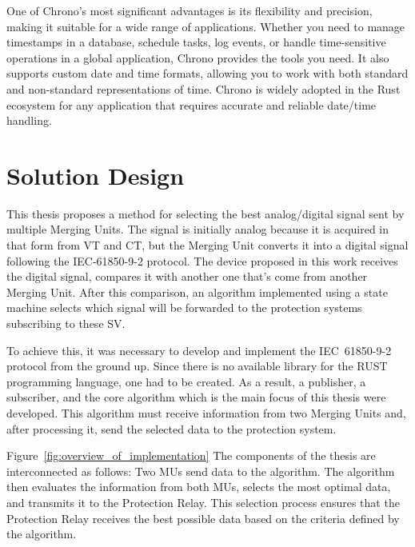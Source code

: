 One of Chrono's most significant advantages is its flexibility and precision, making it suitable for a wide range of applications. Whether you need to manage timestamps in a database, schedule tasks, log events, or handle time-sensitive operations in a global application, Chrono provides the tools you need. It also supports custom date and time formats, allowing you to work with both standard and non-standard representations of time. Chrono is widely adopted in the Rust ecosystem for any application that requires accurate and reliable date/time handling.

\section{Solution Design}

This thesis proposes a method for selecting the best analog/digital signal sent by multiple Merging Units. The signal is initially analog because it is acquired in that form from VT and CT, but the Merging Unit converts it into a digital signal following the IEC-61850-9-2 protocol. The device proposed in this work receives the digital signal, compares it with another one that's come from another Merging Unit. After this comparison, an algorithm implemented using a state machine selects which signal will be forwarded to the protection systems subscribing to these SV.

To achieve this, it was necessary to develop and implement the IEC~61850-9-2 protocol from the ground up. Since there is no available library for the RUST programming language, one had to be created. As a result, a publisher, a subscriber, and the core algorithm which is the main focus of this thesis were developed. This algorithm must receive information from two Merging Units and, after processing it, send the selected data to the protection system.

Figure~\ref{fig:overview_of_implementation} The components of the thesis are interconnected as follows: Two MUs send data to the algorithm. The algorithm then evaluates the information from both MUs, selects the most optimal data, and transmits it to the Protection Relay. This selection process ensures that the Protection Relay receives the best possible data based on the criteria defined by the algorithm.

